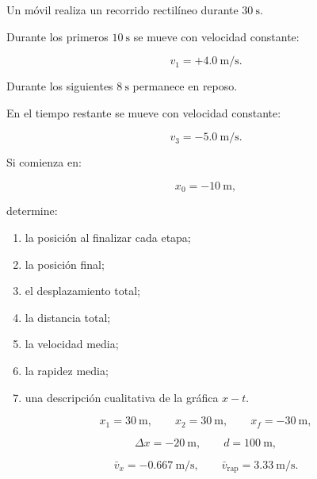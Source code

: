 \begin{ejercicio}
Un móvil realiza un recorrido rectilíneo durante \(\SI{30}{\second}\).

Durante los primeros \(\SI{10}{\second}\) se mueve con velocidad constante:

\[ v_1=+\SI{4.0}{\meter\per\second}. \]

Durante los siguientes \(\SI{8}{\second}\) permanece en reposo.

En el tiempo restante se mueve con velocidad constante:

\[ v_3=-\SI{5.0}{\meter\per\second}. \]

Si comienza en:

\[ x_0=-\SI{10}{\meter}, \]

determine:

\begin{enumerate}[label=\alph*)]
    \item la posición al finalizar cada etapa;
    \item la posición final;
    \item el desplazamiento total;
    \item la distancia total;
    \item la velocidad media;
    \item la rapidez media;
    \item una descripción cualitativa de la gráfica \(x-t\).
\end{enumerate}
\end{ejercicio}

\begin{respuesta}
\[
x_1=\SI{30}{\meter},
\qquad
x_2=\SI{30}{\meter},
\qquad
x_f=-\SI{30}{\meter},
\]

\[
\Delta x=-\SI{20}{\meter},
\qquad
d=\SI{100}{\meter},
\]

\[
\bar{v}_x=-\SI{0.667}{\meter\per\second},
\qquad
\bar{v}_{\mathrm{rap}}=\SI{3.33}{\meter\per\second}.
\]
\end{respuesta}

